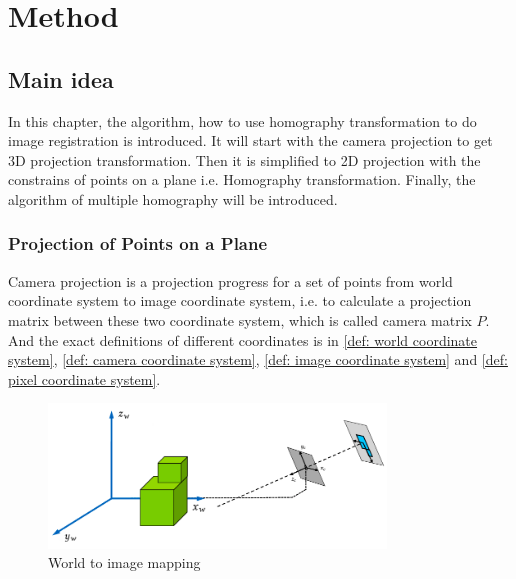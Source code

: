 \chapter{Method}\label{ch:method}
\section{Main idea}\label{sec:main idea}
In this chapter, the algorithm, how to use homography transformation to do image registration is introduced. It will start with the camera projection to get 3D projection transformation. Then it is simplified to 2D projection with the constrains of points on a plane i.e. Homography transformation. Finally,  the algorithm of multiple homography will be introduced. 
\subsection{Projection of Points on a Plane}
Camera projection is a projection progress for a set of points from world coordinate system to image coordinate system, i.e. to calculate a projection matrix between these two coordinate system, which is called camera matrix $P$. And the exact definitions of different coordinates is in \cref{def: world coordinate system}, \cref{def: camera coordinate system}, \cref{def: image coordinate system} and \cref{def: pixel coordinate system}.

\begin{figure}[htbp]
	\centering
	\includegraphics[width=0.80\textwidth]{images/World_to_camera}
	\caption{World to image mapping \cite{collinsPlanarHomographies}}
	\label{fig:worldtocamera}
\end{figure}

